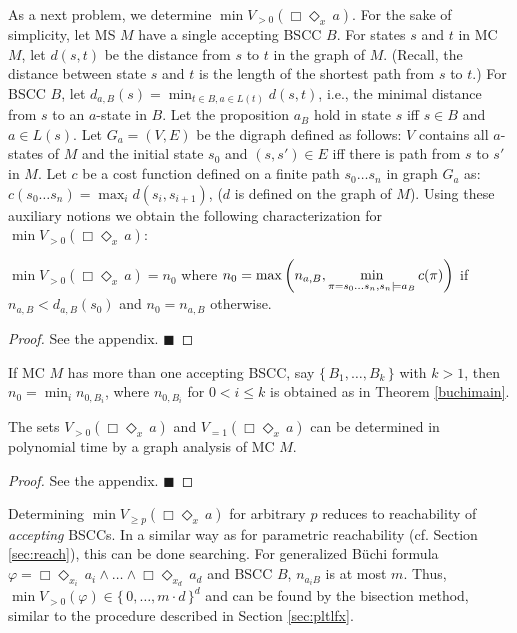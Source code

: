 \documentclass{llncs}
\newcommand{\set}[1]{\{ \, #1 \, \}}
\renewcommand{\leq}{\leqslant}
\renewcommand{\geq}{\geqslant}
\newcommand{\de}{\Diamond}
\newcommand{\bo}{\Box}
\begin{document}
As a next problem, we determine $\min V_{>0}(\Box\de_{x} \, a)$. For the sake of simplicity, let MS $M$ have a single
accepting BSCC $B$.
For states $s$ and $t$ in MC $M$, let $d(s,t)$ be the distance from $s$ to $t$ in the graph of $M$.
(Recall, the distance between state $s$ and $t$ is the length of the shortest path from $s$ to $t$.)
For BSCC $B$, let $d_{a,B}(s) = \min_{t \in B, a \in L(t)} d(s,t)$, i.e., the minimal distance from $s$ to an $a$-state in $B$.
Let the proposition $a_B$ hold in state $s$ iff $s \in B$ and $a \in L(s)$.
Let $G_a = (V,E)$ be the digraph defined as follows: $V$ contains all $a$-states of $M$ and the initial state $s_0$ and $(s,s') \in E$ iff there is path from $s$ to $s'$ in $M$.
Let $c$ be a cost function defined on a finite path $s_0 \ldots s_n$ in graph $G_a$ as: $c(s_0 \ldots s_n) = \max_{i} d(s_i,s_{i+1})$, 
($d$ is defined on the graph of $M$). 
Using these auxiliary notions we obtain the following characterization for $\min V_{>0}(\Box\de_{x} \, a)$:



\begin{theorem}\label{buchimain}
$\min V_{>0}(\Box\de_x \, a) = n_0$ where $n_0 = \displaystyle\max \tiny{\left( n_{a,B}, \min_{\pi = s_0 \ldots s_n, s_n \models a_B} c(\pi) \right)}$ 
if $n_{a,B} < d_{a,B}(s_0)$ and $n_0 = n_{a,B}$ otherwise.
\end{theorem}
\begin{proof}
See the appendix. \hfill $\blacksquare$
 \end{proof}


\noindent
If MC $M$ has more than one accepting BSCC, say $\set{B_1, \ldots, B_k}$ with $k > 1$, then $n_0 = \min_i n_{0,B_i}$, where $n_{0,B_i}$  for $0 < i \leq k$ is obtained as in Theorem \ref{buchimain}.

\begin{proposition}
The sets $V_{>0}(\Box \de_{x} \, a)$ and $V_{=1}(\Box \de_{x} \, a)$ can be determined in polynomial time by a graph analysis of MC $M$.
\end{proposition} 
\begin{proof} 
See the appendix. \hfill $\blacksquare$
\end{proof}

\noindent
Determining $\min V_{\geq p}(\Box \de_{x} \, a)$ for arbitrary $p$ reduces to reachability of \emph{accepting} BSCCs.
In a similar way as for parametric reachability (cf. Section \ref{sec:reach}), this  can be done searching.  
For generalized B\"uchi formula $\varphi = \bo \de_{x_i} \, a_i \wedge\hdots\wedge \bo\de_{x_d} \, a_d$ and BSCC $B$, $n_{a_i B}$ is at most $m$. 
Thus, $\min V_{>0}(\varphi) \in \set{0,\hdots,m{\cdot}d}^d$ and can be found by the bisection method, 
similar to the procedure described in Section \ref{sec:pltlfx}. 
\end{document}
